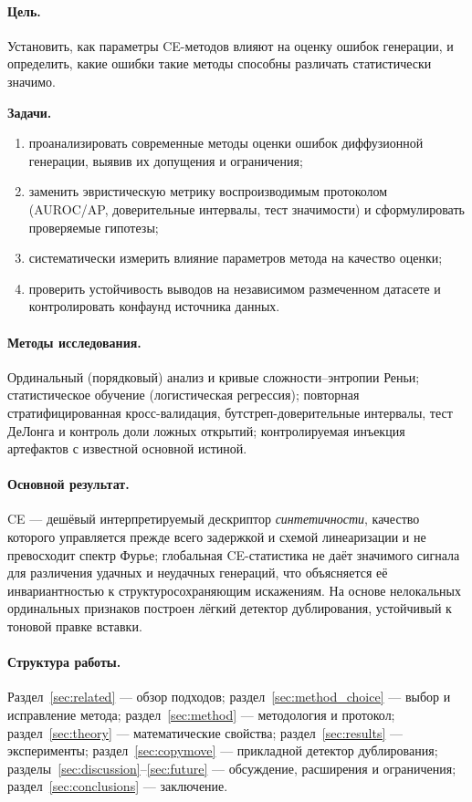 \documentclass[14pt]{extarticle}
\theoremstyle{plain}
\numberwithin{equation}{section}
\numberwithin{figure}{section}
\numberwithin{table}{section}
\begin{document}
\paragraph{Цель.} Установить, как параметры CE-методов влияют на оценку ошибок
генерации, и определить, какие ошибки такие методы способны различать
статистически значимо.

\noindent\textbf{Задачи.}
\begin{enumerate}
\item проанализировать современные методы оценки ошибок диффузионной генерации,
      выявив их допущения и ограничения;
\item заменить эвристическую метрику воспроизводимым протоколом (AUROC/AP,
      доверительные интервалы, тест значимости) и сформулировать проверяемые
      гипотезы;
\item систематически измерить влияние параметров метода на качество оценки;
\item проверить устойчивость выводов на независимом размеченном датасете и
      контролировать конфаунд источника данных.
\end{enumerate}

\paragraph{Методы исследования.} Ординальный (порядковый) анализ и кривые
сложности–энтропии Реньи; статистическое обучение (логистическая регрессия);
повторная стратифицированная кросс-валидация, бутстреп-доверительные интервалы,
тест ДеЛонга и контроль доли ложных открытий; контролируемая инъекция артефактов
с известной основной истиной.

\paragraph{Основной результат.} CE — дешёвый интерпретируемый дескриптор
\emph{синтетичности}, качество которого управляется прежде всего задержкой и
схемой линеаризации и не превосходит спектр Фурье; глобальная CE-статистика не
даёт значимого сигнала для различения удачных и неудачных генераций, что
объясняется её инвариантностью к структуросохраняющим искажениям. На основе
нелокальных ординальных признаков построен лёгкий детектор дублирования,
устойчивый к тоновой правке вставки.

\paragraph{Структура работы.} Раздел~\ref{sec:related} — обзор подходов;
раздел~\ref{sec:method_choice} — выбор и исправление метода;
раздел~\ref{sec:method} — методология и протокол; раздел~\ref{sec:theory} —
математические свойства; раздел~\ref{sec:results} — эксперименты;
раздел~\ref{sec:copymove} — прикладной детектор дублирования;
разделы~\ref{sec:discussion}--\ref{sec:future} — обсуждение, расширения и
ограничения; раздел~\ref{sec:conclusions} — заключение.
\end{document}
